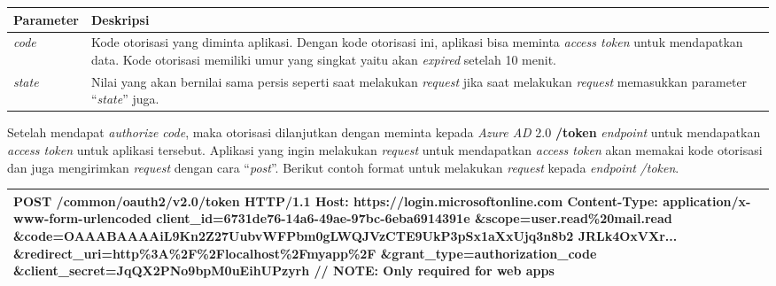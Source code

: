 \begin{description}
\begin{center}
	\begin{tabular}{|p{3cm}|p{12cm}|}
		\hline
		\textbf{Parameter}&\textbf{Deskripsi}\\ \hline
		\textit{code} & Kode otorisasi yang diminta aplikasi. Dengan kode otorisasi ini, aplikasi bisa meminta \textit{access token} untuk mendapatkan data. Kode otorisasi memiliki umur yang singkat yaitu akan \textit{expired} setelah 10 menit. \\ \hline
		 \textit{state} & Nilai yang akan bernilai sama persis seperti saat melakukan \textit{request} jika saat melakukan \textit{request} memasukkan parameter ``\textit{state}'' juga.\\
		 \hline		 
	\end{tabular}
\end{center}

Setelah mendapat \textit{authorize code}, maka otorisasi dilanjutkan dengan meminta kepada \textit{Azure AD} 2.0 \textbf{/token} \textit{endpoint} untuk mendapatkan \textit{access token} untuk aplikasi tersebut. Aplikasi yang ingin melakukan \textit{request} untuk mendapatkan \textit{access token} akan memakai kode otorisasi dan juga mengirimkan \textit{request} dengan cara ``\textit{post}''. Berikut contoh format untuk melakukan \textit{request} kepada \textit{endpoint} \textit{/token}.

\begin{center}
	\begin{tabular}{|p{15cm}|}
		\hline
		POST /common/oauth2/v2.0/token HTTP/1.1\newline
		Host: https://login.microsoftonline.com\newline
		Content-Type: application/x-www-form-urlencoded\newline
		\newline
		client\_id=6731de76-14a6-49ae-97bc-6eba6914391e\newline
		\&scope=user.read\%20mail.read\newline
		\&code=OAAABAAAAiL9Kn2Z27UubvWFPbm0gLWQJVzCTE9UkP3pSx1aXxUjq3n8b2\newline
		JRLk4OxVXr...\newline
		\&redirect\_uri=http\%3A\%2F\%2Flocalhost\%2Fmyapp\%2F\newline
		\&grant\_type=authorization\_code\newline
		\&client\_secret=JqQX2PNo9bpM0uEihUPzyrh    // NOTE: Only required for web apps\\
		\hline
	\end{tabular}
\end{center} 


\end{description}
